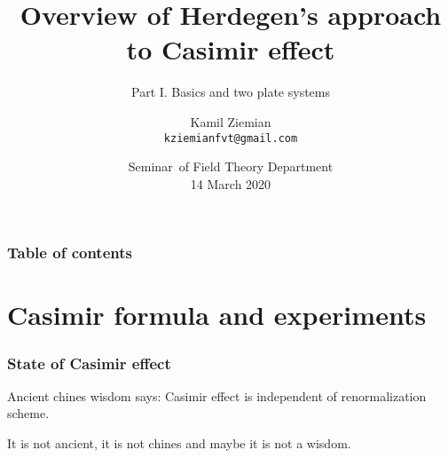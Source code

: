 \documentclass[10pt,t]{beamer}
\title{Overview of Herdegen's approach to Casimir effect}
\subtitle{Part I. Basics and two plate systems}
\author{Kamil Ziemian \\
  \texttt{kziemianfvt@gmail.com}}
\institute{Uniwersytet Jagielloński w~Krakowie}
\date[14 March 2020]{Seminar~of Field Theory Department \\
  14 March 2020}
\begin{document}





\maketitle %





\begin{frame}
  \frametitle{Table of contents}


  \tableofcontents %

\end{frame}










\section{Casimir formula and experiments}



\begin{frame}
  \frametitle{State of Casimir effect}


  Ancient chines wisdom says: Casimir effect is independent of
  renormalization scheme.

  It is not ancient, it is not chines and maybe it is not a wisdom.

\end{frame}
\end{document}
